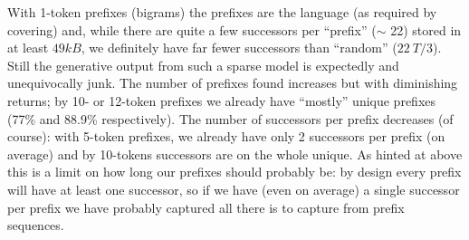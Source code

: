 \documentclass[11pt, oneside]{amsart}   	%
\begin{document}
With 1-token prefixes (bigrams) the prefixes are the language (as required by covering) and, while there are quite a few successors per ``prefix'' ($\sim$ 22) stored in at least $49kB$, we definitely have far fewer successors than ``random'' ($22 ~ T/3$). Still the generative output from such a sparse model is expectedly and unequivocally junk. The number of prefixes found increases but with diminishing returns; by 10- or 12-token prefixes we already have ``mostly'' unique prefixes (77\% and 88.9\% respectively). The number of successors per prefix decreases (of course): with 5-token prefixes, we already have only 2 successors per prefix (on average) and by 10-tokens successors are on the whole unique. As hinted at above this is a limit on how long our prefixes should probably be: by design every prefix will have at least one successor, so if we have (even on average) a single successor per prefix we have probably captured all there is to capture from prefix sequences. 
\end{document}
